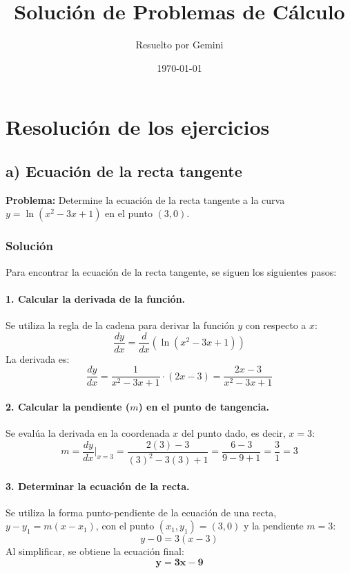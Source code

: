 \documentclass[12pt, letterpaper]{article}
\title{Solución de Problemas de Cálculo}
\author{Resuelto por Gemini}
\date{\today}
\begin{document}
\maketitle

\section*{Resolución de los ejercicios}

\subsection*{a) Ecuación de la recta tangente}
\textbf{Problema:} Determine la ecuación de la recta tangente a la curva $y = \ln(x^2 - 3x + 1)$ en el punto $(3,0)$.

\subsubsection*{Solución}
Para encontrar la ecuación de la recta tangente, se siguen los siguientes pasos:

\paragraph{1. Calcular la derivada de la función.}
Se utiliza la regla de la cadena para derivar la función $y$ con respecto a $x$:
$$
\frac{dy}{dx} = \frac{d}{dx} \left( \ln(x^2 - 3x + 1) \right)
$$
La derivada es:
$$
\frac{dy}{dx} = \frac{1}{x^2 - 3x + 1} \cdot (2x - 3) = \frac{2x - 3}{x^2 - 3x + 1}
$$

\paragraph{2. Calcular la pendiente ($m$) en el punto de tangencia.}
Se evalúa la derivada en la coordenada $x$ del punto dado, es decir, $x=3$:
$$
m = \frac{dy}{dx}\bigg|_{x=3} = \frac{2(3) - 3}{(3)^2 - 3(3) + 1} = \frac{6 - 3}{9 - 9 + 1} = \frac{3}{1} = 3
$$

\paragraph{3. Determinar la ecuación de la recta.}
Se utiliza la forma punto-pendiente de la ecuación de una recta, $y - y_1 = m(x - x_1)$, con el punto $(x_1, y_1) = (3,0)$ y la pendiente $m=3$:
$$
y - 0 = 3(x - 3)
$$
Al simplificar, se obtiene la ecuación final:
$$
\mathbf{y = 3x - 9}
$$

\hrulefill
\end{document}
